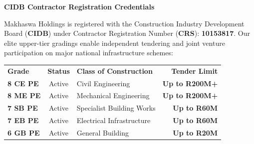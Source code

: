 \hypertarget{sec:accreditations}{}

\noindent
\begin{minipage}[t]{0.62\textwidth}
    {\large\bfseries\color{mhnavy} CIDB Contractor Registration Credentials}
    \vspace{0.10cm}

    {\fontsize{8.8pt}{12.4pt}\selectfont\color{mhtext}
    Makhaswa Holdings is registered with the Construction Industry Development Board (\textbf{CIDB}) under Contractor Registration Number (\textbf{CRS}): \textbf{10153817}. Our elite upper-tier gradings enable independent tendering and joint venture participation on major national infrastructure schemes:
    }

    \vspace{0.15cm}

    \renewcommand{\arraystretch}{1.25}
    \begin{tabularx}{\linewidth}{@{}l c p{3.6cm} r@{}}
    \rowcolor{mhnavy}
    {\color{white}\bfseries\fontsize{7.6pt}{9.2pt}\selectfont Grade} & {\color{white}\bfseries\fontsize{7.6pt}{9.2pt}\selectfont Status} & {\color{white}\bfseries\fontsize{7.6pt}{9.2pt}\selectfont Class of Construction} & {\color{white}\bfseries\fontsize{7.6pt}{9.2pt}\selectfont Tender Limit} \\
    \rowcolor{mhbluelight}
    \fontsize{7.5pt}{9.2pt}\selectfont\bfseries 8 CE PE & \fontsize{7.5pt}{9.2pt}\selectfont Active & \fontsize{7.5pt}{9.2pt}\selectfont Civil Engineering & \fontsize{7.5pt}{9.2pt}\selectfont\bfseries Up to R200M+ \\
    \fontsize{7.5pt}{9.2pt}\selectfont\bfseries 8 ME PE & \fontsize{7.5pt}{9.2pt}\selectfont Active & \fontsize{7.5pt}{9.2pt}\selectfont Mechanical Engineering & \fontsize{7.5pt}{9.2pt}\selectfont\bfseries Up to R200M+ \\
    \rowcolor{mhbluelight}
    \fontsize{7.5pt}{9.2pt}\selectfont\bfseries 7 SB PE & \fontsize{7.5pt}{9.2pt}\selectfont Active & \fontsize{7.5pt}{9.2pt}\selectfont Specialist Building Works & \fontsize{7.5pt}{9.2pt}\selectfont\bfseries Up to R60M \\
    \fontsize{7.5pt}{9.2pt}\selectfont\bfseries 7 EB PE & \fontsize{7.5pt}{9.2pt}\selectfont Active & \fontsize{7.5pt}{9.2pt}\selectfont Electrical Infrastructure & \fontsize{7.5pt}{9.2pt}\selectfont\bfseries Up to R60M \\
    \rowcolor{mhbluelight}
    \fontsize{7.5pt}{9.2pt}\selectfont\bfseries 6 GB PE & \fontsize{7.5pt}{9.2pt}\selectfont Active & \fontsize{7.5pt}{9.2pt}\selectfont General Building & \fontsize{7.5pt}{9.2pt}\selectfont\bfseries Up to R20M \\
    \end{tabularx}
    \renewcommand{\arraystretch}{1}
\end{minipage}
